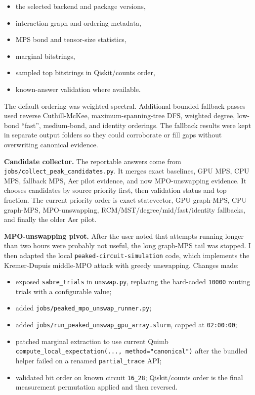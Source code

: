 \documentclass[10pt]{article}
\begin{document}
\begin{itemize}
  \item the selected backend and package versions,
  \item interaction graph and ordering metadata,
  \item MPS bond and tensor-size statistics,
  \item marginal bitstrings,
  \item sampled top bitstrings in Qiskit/counts order,
  \item known-answer validation where available.
\end{itemize}

The default ordering was weighted spectral. Additional bounded fallback passes used reverse Cuthill-McKee, maximum-spanning-tree DFS, weighted degree, low-bond ``fast'', medium-bond, and identity orderings. The fallback results were kept in separate output folders so they could corroborate or fill gaps without overwriting canonical evidence.

\textbf{Candidate collector.}
The reportable answers come from \texttt{jobs/collect\_peak\_candidates.py}. It merges exact baselines, GPU MPS, CPU MPS, fallback MPS, Aer pilot evidence, and now MPO-unswapping evidence. It chooses candidates by source priority first, then validation status and top fraction. The current priority order is exact statevector, GPU graph-MPS, CPU graph-MPS, MPO-unswapping, RCM/MST/degree/mid/fast/identity fallbacks, and finally the older Aer pilot.

\textbf{MPO-unswapping pivot.}
After the user noted that attempts running longer than two hours were probably not useful, the long graph-MPS tail was stopped. I then adapted the local \texttt{peaked-circuit-simulation} code, which implements the Kremer-Dupuis middle-MPO attack with greedy unswapping. Changes made:

\begin{itemize}
  \item exposed \texttt{sabre\_trials} in \texttt{unswap.py}, replacing the hard-coded \texttt{10000} routing trials with a configurable value;
  \item added \texttt{jobs/peaked\_mpo\_unswap\_runner.py};
  \item added \texttt{jobs/run\_peaked\_unswap\_gpu\_array.slurm}, capped at \texttt{02:00:00};
  \item patched marginal extraction to use current Quimb \texttt{compute\_local\_expectation(..., method="canonical")} after the bundled helper failed on a renamed \texttt{partial\_trace} API;
  \item validated bit order on known circuit \texttt{16\_28}; Qiskit/counts order is the final measurement permutation applied and then reversed.
\end{itemize}
\end{document}
